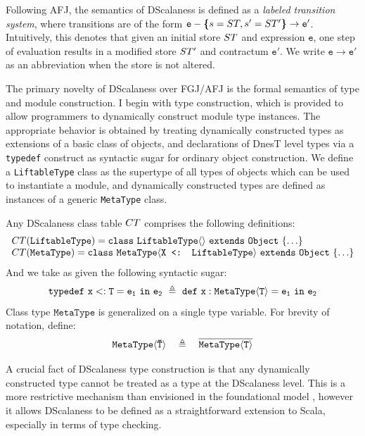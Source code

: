 Following AFJ, the semantics of DScalaness is defined as a \emph{labeled transition system},
where transitions are of the form $\texttt{e} - \textup{\textbf{\{}} s = ST, s' = ST' \textup{\textbf{\}}} \rightarrow
\texttt{e}' $. Intuitively, this denotes that given an initial store $ST$ and expression
$\texttt{e}$, one step of evaluation results in a modified store $ST'$ and contractum
$\texttt{e}'$. We write $\texttt{e} \rightarrow \texttt{e}'$ as an abbreviation when the store
is not altered.

The primary novelty of DScalaness over FGJ/AFJ is the formal semantics of type and module
construction. I begin with type construction, which is provided to allow programmers to
dynamically construct module type instances. The appropriate behavior is obtained by treating
dynamically constructed types as extensions of a basic class of objects, and declarations of
DnesT level types via a \texttt{typedef} construct as syntactic sugar for ordinary object
construction. We define a \texttt{LiftableType} class as the supertype of all types of objects
which can be used to instantiate a module, and dynamically constructed types are defined as
instances of a generic \texttt{MetaType} class.
\begin{definition}
\label{definition-classtable}
Any DScalaness class table ${CT}$ comprises the following definitions:
$$
\begin{array}{l}
{CT}(\texttt{LiftableType}) = \mathtt{class\ \texttt{LiftableType}\langle \rangle\ extends\ Object\ \{\ldots \}}\\
{CT}(\texttt{MetaType}) = \mathtt{class\ \texttt{MetaType}\langle \texttt{X <: LiftableType}\rangle\ extends\ Object\ \{ \ldots  \}}
\end{array}
$$
And we take as given the following syntactic sugar:
$$
\jtlet{x}{T}{e_1}{e_2}\ \defeq\ \jdef{x}{\jinst{MetaType}{T}}{e_1}{e_2}
$$
Class type $\texttt{MetaType}$ is generalized on a single type variable. For brevity of
notation, define:
$$
\mathtt{\texttt{MetaType}\langle {\ensuremath{\mathtt{\bar{T}}}} \rangle}\quad \triangleq \quad \overline{\mathtt{MetaType\langle T \rangle}}
$$
\end{definition}
A crucial fact of DScalaness type construction is that any dynamically constructed type cannot be
treated as a type at the DScalaness level. This is a more restrictive mechanism than envisioned
in the foundational model \cite{FramedML,FramedMLworkshop}, however it allows DScalaness to be
defined as a straightforward extension to Scala, especially in terms of type checking.

